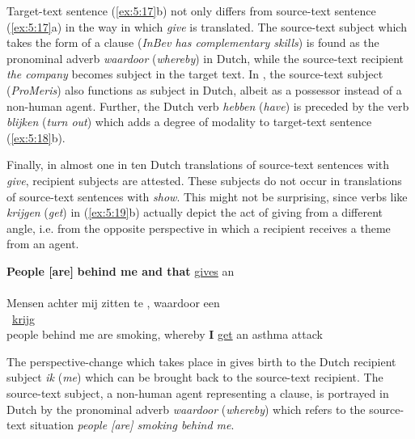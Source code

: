 \documentclass[output=paper]{LSP/langsci}
\begin{document}
Target-text sentence (\ref{ex:5:17}b) not only differs from source-text sentence (\ref{ex:5:17}a) in the way in which \textit{give} is translated. The source-text subject which takes the form of a clause (\textit{InBev has complementary skills}) is found as the pronominal adverb \textit{waardoor} (\textit{whereby}) in Dutch, while the source-text recipient \textit{the company} becomes subject in the target text. In , the source-text subject (\textit{ProMeris}) also functions as subject in Dutch, albeit as a possessor instead of a non-human agent. Further, the Dutch verb \textit{hebben} (\textit{have}) is preceded by the verb \textit{blijken} (\textit{turn out}) which adds a degree of modality to target-text sentence (\ref{ex:5:18}b). 

Finally, in almost one in ten Dutch translations of source-text sentences with \textit{give}, recipient subjects are attested. These subjects do not occur in translations of source-text sentences with \textit{show}. This might not be surprising, since verbs like \textit{krijgen} (\textit{get}) in (\ref{ex:5:19}b) actually depict the act of giving from a different angle, i.e. from the opposite perspective in which a recipient receives a theme from an agent.   

\ea \label{ex:5:19}
\ea
\textbf{People [are]}  \textbf{behind me and that} \ul{gives}  an\\\,  \\[1em]
\ex
Mensen achter mij zitten te , waardoor  een\\	\,  \ul{krijg}\\
people behind me are smoking, whereby \textbf{I} \ul{get} an asthma attack
\z
\z


The perspective-change which takes place in  gives birth to the Dutch recipient subject \textit{ik} (\textit{me}) which can be brought back to the source-text recipient. The source-text subject, a non-human agent representing a clause, is portrayed in Dutch by the pronominal adverb \textit{waardoor} (\textit{whereby}) which refers to the source-text situation \textit{people [are] smoking behind me}.
  
\end{document}
